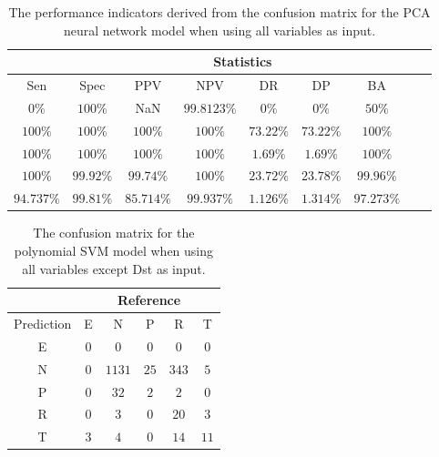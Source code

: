 \begin{table}[!ht]
	\centering
	\begin{tabular}{|c|c|c|c|c|c|c|c|c|}
		\hline
		 & \multicolumn{7}{c|}{Statistics} \\ \hline
		Sen & Spec & PPV & NPV & DR & DP & BA \\ \hline
		$0\%$ & $100\%$ & NaN & $99.8123\%$ & $0\%$ & $0\%$ & $50\%$ \\ \hline
		$100\%$ & $100\%$ & $100\%$ & $100\%$ & $73.22\%$ & $73.22\%$ & $100\%$ \\ \hline
		$100\%$ & $100\%$ & $100\%$ & $100\%$ & $1.69\%$ & $1.69\%$ & $100\%$ \\ \hline
		$100\%$ & $99.92\%$ & $99.74\%$ & $100\%$ & $23.72\%$ & $23.78\%$ & $99.96\%$ \\ \hline
		$94.737\%$ & $99.81\%$ & $85.714\%$ & $99.937\%$ & $1.126\%$ & $1.314\%$ & $97.273\%$ \\ \hline
	\end{tabular}
	\caption{The performance indicators derived from the confusion matrix for the PCA neural network model when using all variables as input.}
	\label{tab:cs:all:pcaNNet}
\end{table}

\begin{table}[!ht]
	\centering
	\begin{tabular}{|c|c|c|c|c|c|}
		\hline
		 & \multicolumn{5}{|c|}{Reference} \\ \hline
		 Prediction & E & N & P & R & T \\ \hline
		 E & $0$ & $0$ & $0$ & $0$ & $0$ \\ \hline
		 N & $0$ & $1131$ & $25$ & $343$ & $5$ \\ \hline
		 P & $0$ & $32$ & $2$ & $2$ & $0$ \\ \hline
		 R & $0$ & $3$ & $0$ & $20$ & $3$ \\ \hline
		 T & $3$ & $4$ & $0$ & $14$ & $11$ \\ \hline
	\end{tabular}
	\caption{The confusion matrix for the polynomial SVM model when using all variables except Dst as input.}
	\label{tab:cm:noDst:svmPoly}
\end{table}

